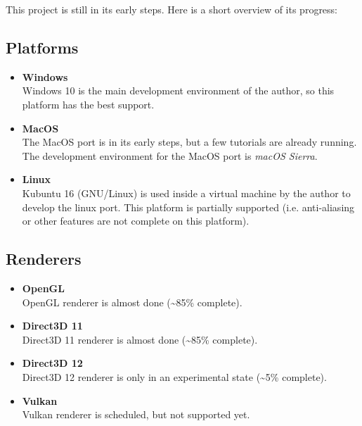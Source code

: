 \documentclass{article}
\begin{document}
This project is still in its early steps. Here is a short overview of its progress:

\subsection{Platforms}
\begin{itemize}
	\item \textbf{Windows} \\
	Windows 10 is the main development environment of the author, so this platform has the best support.
	
	\item \textbf{MacOS} \\
	The MacOS port is in its early steps, but a few tutorials are already running.
	The development environment for the MacOS port is \emph{macOS Sierra}.
	
	\item \textbf{Linux} \\
	Kubuntu 16 (GNU/Linux) is used inside a virtual machine by the author to develop the linux port.
	This platform is partially supported (i.e. anti-aliasing or other features are not complete on this platform).
\end{itemize}
	
\subsection{Renderers}
\begin{itemize}
	\item \textbf{OpenGL} \\
	OpenGL renderer is almost done (\textasciitilde 85\% complete).
	
	\item \textbf{Direct3D 11} \\
	Direct3D 11 renderer is almost done (\textasciitilde 85\% complete).
	
	\item \textbf{Direct3D 12} \\
	Direct3D 12 renderer is only in an experimental state (\textasciitilde 5\% complete).
	
	\item \textbf{Vulkan} \\
	Vulkan renderer is scheduled, but not supported yet.
\end{itemize}


\end{document}
